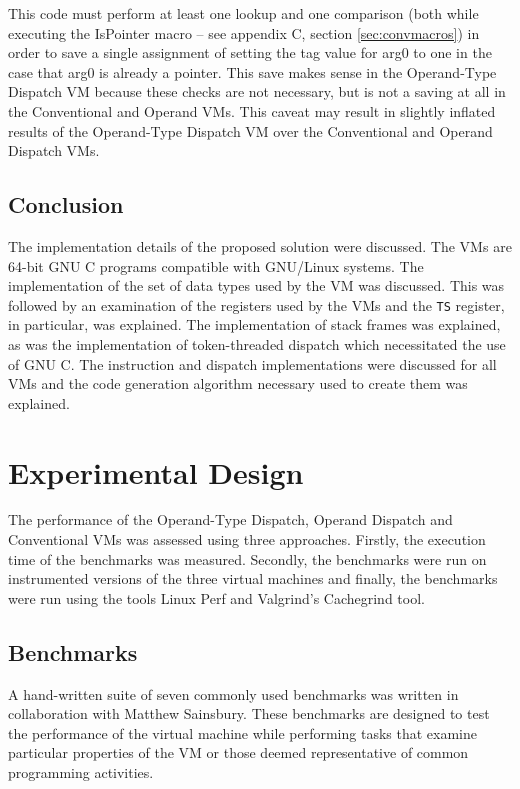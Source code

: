 \documentclass[english,a4paper,12pt]{report}
\begin{document}
This code must perform at least one lookup and one comparison (both
while executing the IsPointer macro -- see appendix C, section
\ref{sec:convmacros}) in order to save a single assignment of setting
the tag value for arg0 to one in the case that arg0 is already a
pointer. This save makes sense in the Operand-Type Dispatch VM because
these checks are not necessary, but is not a saving at all in the
Conventional and Operand VMs. This caveat may result in slightly
inflated results of the Operand-Type Dispatch VM over the Conventional
and Operand Dispatch VMs.

\section{Conclusion}
The implementation details of the proposed solution were
discussed. The VMs are 64-bit GNU C programs compatible with GNU/Linux
systems. The implementation of the set of data types used by the VM
was discussed. This was followed by an examination of the registers
used by the VMs and the \verb|TS| register, in particular, was
explained. The implementation of stack frames was explained, as was
the implementation of token-threaded dispatch which necessitated the
use of GNU C. The instruction and dispatch implementations were
discussed for all VMs and the code generation algorithm necessary used
to create them was explained.

\chapter{Experimental Design}

The performance of the Operand-Type Dispatch, Operand Dispatch and
Conventional VMs was assessed using three approaches. Firstly, the
execution time of the benchmarks was measured. Secondly, the
benchmarks were run on instrumented versions of the three virtual
machines and finally, the benchmarks were run using the tools Linux
Perf and Valgrind's Cachegrind \cite{cachegrind} tool.

\section{Benchmarks}

A hand-written suite of seven commonly used benchmarks was written in
collaboration with Matthew Sainsbury. These benchmarks are designed to
test the performance of the virtual machine while performing tasks
that examine particular properties of the VM or those deemed
representative of common programming activities.
\end{document}
